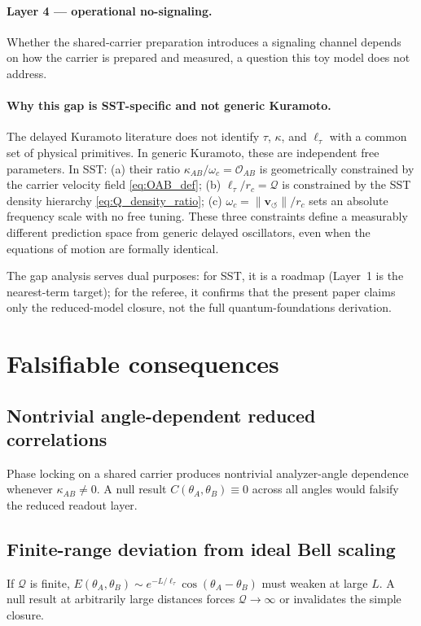 \documentclass[11pt]{article}
\newcommand{\vnorm}{\lVert \mathbf{v}_{\!\boldsymbol{\circlearrowleft}}\rVert}
\begin{document}
\paragraph{Layer 4 — operational no-signaling.}
Whether the shared-carrier preparation introduces a signaling channel depends on how the carrier is prepared and measured, a question this toy model does not address.

\paragraph{Why this gap is SST-specific and not generic Kuramoto.}
The delayed Kuramoto literature does not identify $\tau$, $\kappa$, and $\ell_\tau$ with a common set of physical primitives. In generic Kuramoto, these are independent free parameters. In SST: (a) their ratio $\kappa_{AB}/\omega_c = \mathcal{O}_{AB}$ is geometrically constrained by the carrier velocity field \cref{eq:OAB_def}; (b) $\ell_\tau/r_c = \mathcal{Q}$ is constrained by the SST density hierarchy \cref{eq:Q_density_ratio}; (c) $\omega_c = \vnorm/r_c$ sets an absolute frequency scale with no free tuning. These three constraints define a measurably different prediction space from generic delayed oscillators, even when the equations of motion are formally identical.

The gap analysis serves dual purposes: for SST, it is a roadmap (Layer~1 is the nearest-term target); for the referee, it confirms that the present paper claims only the reduced-model closure, not the full quantum-foundations derivation.

\section{Falsifiable consequences}

\subsection{Nontrivial angle-dependent reduced correlations}
Phase locking on a shared carrier produces nontrivial analyzer-angle dependence whenever $\kappa_{AB} \neq 0$. A null result $C(\theta_A,\theta_B) \equiv 0$ across all angles would falsify the reduced readout layer.

\subsection{Finite-range deviation from ideal Bell scaling}
If $\mathcal{Q}$ is finite, $E(\theta_A,\theta_B) \sim e^{-L/\ell_\tau}\cos(\theta_A - \theta_B)$ must weaken at large $L$. A null result at arbitrarily large distances forces $\mathcal{Q} \to \infty$ or invalidates the simple closure.
\end{document}
